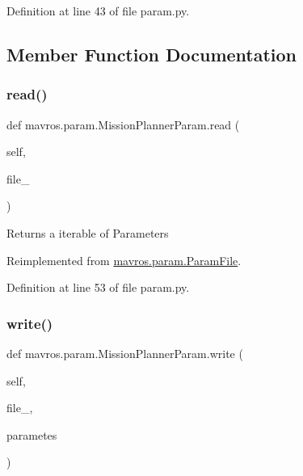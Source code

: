 Definition at line 43 of file param.\+py.



\subsection{Member Function Documentation}
\mbox{\label{classmavros_1_1param_1_1MissionPlannerParam_a63149181028a5484884aebc70499ec97}} 
\subsubsection{\texorpdfstring{read()}{read()}}
{\footnotesize\ttfamily def mavros.\+param.\+Mission\+Planner\+Param.\+read (\begin{DoxyParamCaption}\item[{}]{self,  }\item[{}]{file\+\_\+ }\end{DoxyParamCaption})}

\begin{DoxyVerb}Returns a iterable of Parameters\end{DoxyVerb}
 

Reimplemented from \mbox{\hyperlink{classmavros_1_1param_1_1ParamFile_adb004524182c02e4bd16705c259895d2}{mavros.\+param.\+Param\+File}}.



Definition at line 53 of file param.\+py.

\mbox{\label{classmavros_1_1param_1_1MissionPlannerParam_accdcc5b51babb10e3212241d71587210}} 
\subsubsection{\texorpdfstring{write()}{write()}}
{\footnotesize\ttfamily def mavros.\+param.\+Mission\+Planner\+Param.\+write (\begin{DoxyParamCaption}\item[{}]{self,  }\item[{}]{file\+\_\+,  }\item[{}]{parametes }\end{DoxyParamCaption})}

